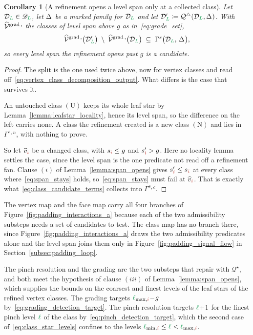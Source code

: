 \documentclass[a4paper, 12pt]{article}
\makeatletter
\newcommand{\quadriF}{\mathcal{Q}^{\triangle}}                   %
\newcommand{\quadriV}{\mathcal{Q}^{\star}}                       %
\newcommand{\collectC}{\Gamma^{s}}                               %
\DeclareRobustCommand{\gradeClasses}[1][]{\widehat{\V}^{\mathrm{grad} \, \ifx\@empty#1\@empty\else,#1\fi}}
\newcommand{\quadriVup}[1]{\quadriV_{\rightarrow #1}}            %
\newcommand{\lminIdx}[1]{\l_{\min,#1}}
\newcommand{\lmaxIdx}[1]{\l_{\max,#1}}
\newcommand{\levelSpan}[1]{s_{#1}}
\newcommand{\green}{\color{ForestGreen}}
\newcommand{\brickred}{\color{BrickRed}}
\newcommand{\V}{\mathcal{V}}
\DeclareRobustCommand{\simplexsubsetTwo}[2][]{\Delta\ifx\@empty#1\@empty\else^{#1}\fi_{#2}}
\newcommand{\vertexClass}[1]{\widehat{v}_{#1}}
\newcommand{\coarseIdxone}{{\brickred i}}
\renewcommand{\l}{{\green\ell}}
\renewcommand{\L}{{\green L}}
\newtheorem{corollary}[theorem]{Corollary}
\theoremstyle{definition}
\theoremstyle{plain}
\numberwithin{equation}{section}
\newcommand{\tobecut}[1]{{\color{red} #1}}     %
\DeclareRobustCommand{\domseq}[1][]{\mathcal{D}\ifx\@empty#1\@empty\else_{#1}\fi}
\newcommand{\alldomseqs}{\mathscr{D}}
\makeatother
\begin{document}
\begin{corollary}[A refinement opens a level span only at a collected class]
    \label{cor:span_candidates}
    Let $\domseq[\L] \in \alldomseqs_\L$, let $\simplexsubsetTwo{}$ be a marked family for $\domseq[\L]$ and let $\domseq[\L]' \coloneq \quadriF(\domseq[\L], \simplexsubsetTwo{})$. With $\gradeClasses$ the classes of level span above $g$ as in~\eqref{eq:grade_set},
    \begin{equation}
        \label{eq:span_candidates}
        \gradeClasses \big( \domseq[\L]' \big) \; \setminus \; \gradeClasses \big( \domseq[\L] \big) \; \subseteq \; \collectC \big( \domseq[\L], \, \simplexsubsetTwo{} \big) ,
    \end{equation}
    so every level span the refinement opens past $g$ is a candidate.
\end{corollary}
\begin{proof}
    The split is the one used twice above, now for vertex classes and read off~\eqref{eq:vertex_class_decomposition_output}. What differs is the case that survives it.

    An untouched class $(\mathrm{U})$ keeps its whole leaf star by Lemma~\ref{lemma:leafstar_locality}, hence its level span, so the difference on the left carries none. A class the refinement created is a new class $(\mathrm{N})$ and lies in $\collectC{}^{,n}$, with nothing to prove.

    So let $\vertexClass{\coarseIdxone}$ be a changed class, with $\levelSpan{\coarseIdxone} \leq g$ and $\levelSpan{\coarseIdxone}' > g$. Here no locality lemma settles the case, since the level span is the one predicate not read off a refinement fan. Clause $(i)$ of Lemma~\ref{lemma:span_opens} gives $\levelSpan{\coarseIdxone}' \leq \levelSpan{\coarseIdxone}$ at every class where~\eqref{eq:span_stays} holds, so~\eqref{eq:span_stays} must fail at $\vertexClass{\coarseIdxone}$. That is exactly what~\eqref{eq:class_candidate_terms} collects into $\collectC{}^{,c}$.
\end{proof}

The vertex map and the face map carry all four branches of Figure~\ref{fig:padding_interactions_a} because each of the two admissibility substeps needs a set of candidates to test. The class map has no branch there, since Figure~\ref{fig:padding_interactions_a} draws the two admissibility predicates alone and the level span joins them only in Figure~\ref{fig:padding_signal_flow} in Section~\ref{subsec:padding_loop}.

The pinch resolution and the grading are the two substeps that repair with $\quadriV$, and both meet the hypothesis of clause $(iii)$ of Lemma~\ref{lemma:span_opens}, which supplies the bounds on the coarsest and finest levels of the leaf stars of the refined vertex classes. The grading targets $\lmaxIdx{\coarseIdxone} \! - \! g$ by~\eqref{eq:grading_detection_target}. The pinch resolution targets $\l \! + \! 1$ for the finest pinch level $\l$ of the class by~\eqref{eq:pinch_detection_target}, which the second case of~\eqref{eq:class_star_levels} confines to the levels $\lminIdx{\coarseIdxone} \leq \l < \lmaxIdx{\coarseIdxone}$.
\end{document}
